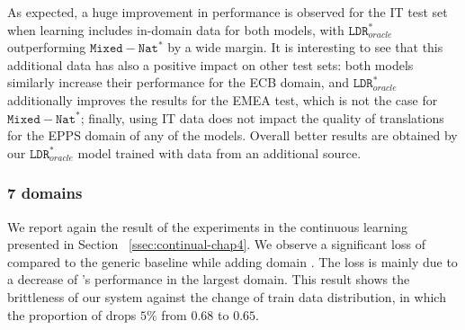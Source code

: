 \begin{table}[!h]
\begin{center}
\end{center}
\caption{BLEU scores for the Transformer architecture when including IT as additional domain \label{tab:add-chap5}}
\end{table}

As expected, a huge improvement in performance is observed for the IT test set when learning includes in-domain data for both models, with $\mathtt{LDR}_{oracle}^*$ outperforming $\mathtt{Mixed-Nat}^*$ by a wide margin.
%
It is interesting to see that this additional data has also a positive impact on other test sets: both models similarly increase their performance for the ECB domain, and $\mathtt{LDR}_{oracle}^*$ additionally improves the results for the EMEA test, which is not the case for $\mathtt{Mixed-Nat}^*$;
finally, using IT data does not impact the quality of translations for the EPPS domain of any of the models. Overall better results are obtained by our $\mathtt{LDR}_{oracle}^*$ model trained with data from an additional source.

\subsubsection{7 domains}
We report again the result of the experiments in the continuous learning presented in Section ~\ref{ssec:continual-chap4}. We observe a significant loss of  compared to the generic baseline  while adding domain . The loss is mainly due to a decrease of 's performance in the largest  domain. This result shows the brittleness of our system against the change of train data distribution, in which the proportion of  drops $5\%$ from $0.68$ to $0.65$.

